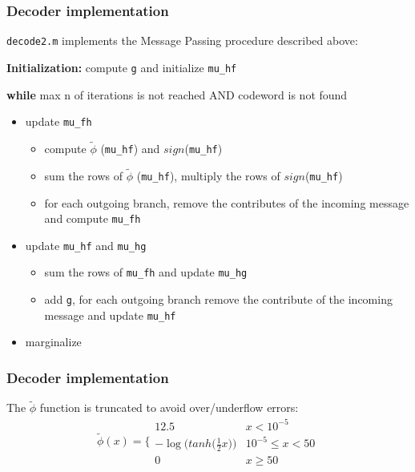 \documentclass[]{beamer}
\begin{document}
\begin{frame}
\transwipe[direction=0]
\frametitle{Decoder implementation}
\texttt{decode2.m} implements the Message Passing procedure described above:

\vspace{0.3cm}


\textbf{Initialization:} compute \texttt{g} and initialize \texttt{mu\_hf}

 \textbf{while} max n of iterations is not reached AND codeword is not found
\begin{itemize}
\item update \texttt{mu\_fh}
	\begin{itemize}
		\item compute  $\tilde \phi$ (\texttt{mu\_hf}) and $sign$(\texttt{mu\_hf})
		\item sum the rows of $\tilde \phi$ (\texttt{mu\_hf}), multiply the rows of $sign$(\texttt{mu\_hf})
		\item for each outgoing branch, remove the contributes of the incoming message and compute \texttt{mu\_fh}
	\end{itemize}
\item update \texttt{mu\_hf} and \texttt{mu\_hg}
	\begin{itemize}
		\item sum the rows of \texttt{mu\_fh} and update \texttt{mu\_hg}
		\item add \texttt{g}, for each outgoing branch remove the contribute of the incoming message and update \texttt{mu\_hf}
	\end{itemize}
\item marginalize
\end{itemize}

\end{frame}

\begin{frame}
\transwipe[direction=0]
\frametitle{Decoder implementation}
The $\tilde \phi$ function is truncated to avoid over/underflow errors:
\begin{equation*}
\tilde \phi (x) = \Bigg\{
	\begin{array}{ll}
		12.5 & x < 10^{-5} \\
		-\log \big ( tanh \big( \frac{1}{2}x\big) \big ) & 10^{-5} \leq x < 50 \\
		0 & x \geq 50
	\end{array}
\end{equation*}

\end{frame}
\end{document}
